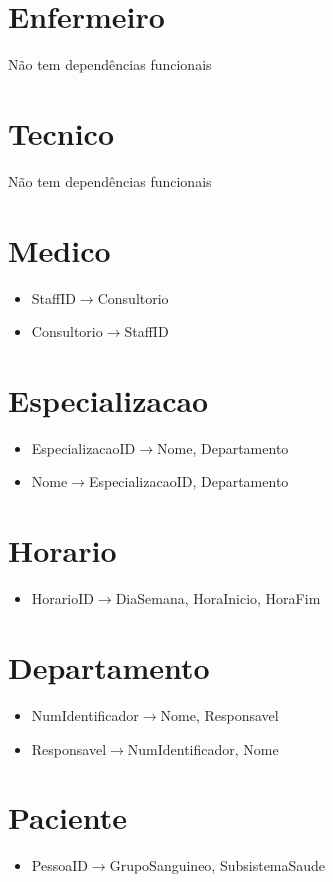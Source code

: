 \documentclass[article, a4paper, 12pt, oneside]{memoir}
\begin{document}
\section*{Enfermeiro}
Não tem dependências funcionais

\section*{Tecnico}
Não tem dependências funcionais

\section*{Medico}
\begin{itemize}
	\item StaffID$\rightarrow$Consultorio
	\item Consultorio$\rightarrow$StaffID
\end{itemize}

\section*{Especializacao}
\begin{itemize}
	\item EspecializacaoID$\rightarrow$Nome, Departamento
	\item Nome$\rightarrow$EspecializacaoID, Departamento
\end{itemize}

\section*{Horario}
\begin{itemize}
	\item HorarioID$\rightarrow$DiaSemana, HoraInicio, HoraFim
\end{itemize}

\section*{Departamento}
\begin{itemize}
	\item NumIdentificador$\rightarrow$Nome, Responsavel
	\item Responsavel$\rightarrow$NumIdentificador, Nome
\end{itemize}

\section*{Paciente}
\begin{itemize}
	\item PessoaID$\rightarrow$GrupoSanguineo, SubsistemaSaude
\end{itemize}
\end{document}
